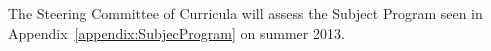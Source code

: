 {\color{red} 

The Steering Committee of Curricula will assess the Subject Program seen in Appendix~\ref{appendix:SubjecProgram} on summer 2013.

}

%
%
%

